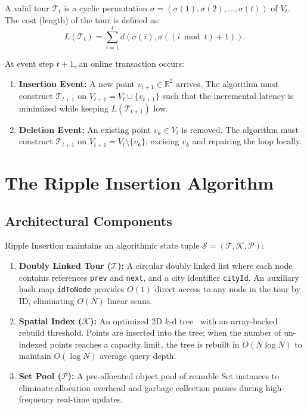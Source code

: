 \documentclass{article}
\theoremstyle{definition}
\begin{document}
A valid tour $\mathcal{T}_t$ is a cyclic permutation $\sigma = (\sigma(1), \sigma(2), \dots, \sigma(t))$ of $V_t$. The cost (length) of the tour is defined as:
\begin{equation}
L(\mathcal{T}_t) = \sum_{i=1}^t d(\sigma(i), \sigma((i \bmod t) + 1)).
\end{equation}

At event step $t+1$, an online transaction occurs:
\begin{enumerate}
    \item \textbf{Insertion Event:} A new point $v_{t+1} \in \mathbb{R}^2$ arrives. The algorithm must construct $\mathcal{T}_{t+1}$ on $V_{t+1} = V_t \cup \{v_{t+1}\}$ such that the incremental latency is minimized while keeping $L(\mathcal{T}_{t+1})$ low.
    \item \textbf{Deletion Event:} An existing point $v_k \in V_t$ is removed. The algorithm must construct $\mathcal{T}_{t+1}$ on $V_{t+1} = V_t \setminus \{v_k\}$, excising $v_k$ and repairing the loop locally.
\end{enumerate}

\section{The Ripple Insertion Algorithm}

\subsection{Architectural Components}

Ripple Insertion maintains an algorithmic state tuple $\mathcal{S} = (\mathcal{T}, \mathcal{K}, \mathcal{P})$:
\begin{enumerate}
    \item \textbf{Doubly Linked Tour ($\mathcal{T}$):} A circular doubly linked list where each node contains references \texttt{prev} and \texttt{next}, and a city identifier \texttt{cityId}. An auxiliary hash map \texttt{idToNode} provides $O(1)$ direct access to any node in the tour by ID, eliminating $O(N)$ linear scans.
    \item \textbf{Spatial Index ($\mathcal{K}$):} An optimized 2D $k$-d tree~\cite{bentley1975multidimensional} with an array-backed rebuild threshold. Points are inserted into the tree; when the number of un-indexed points reaches a capacity limit, the tree is rebuilt in $O(N \log N)$ to maintain $O(\log N)$ average query depth.
    \item \textbf{Set Pool ($\mathcal{P}$):} A pre-allocated object pool of reusable Set instances to eliminate allocation overhead and garbage collection pauses during high-frequency real-time updates.
\end{enumerate}
\end{document}
